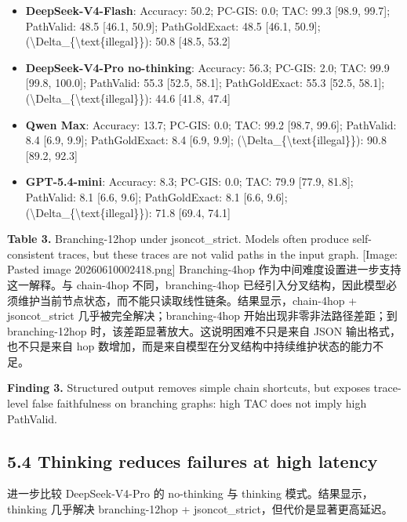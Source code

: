 \documentclass[
  11pt,
]{article}
\providecommand{\tightlist}{%
  \setlength{\itemsep}{0pt}\setlength{\parskip}{0pt}}
\begin{document}
\begin{itemize}
\tightlist
\item
  \textbf{DeepSeek-V4-Flash}: Accuracy: 50.2; PC-GIS: 0.0; TAC: 99.3
  {[}98.9, 99.7{]}; PathValid: 48.5 {[}46.1, 50.9{]}; PathGoldExact:
  48.5 {[}46.1, 50.9{]};
  (\textbackslash Delta\_\{\textbackslash text\{illegal\}\}): 50.8
  {[}48.5, 53.2{]}
\item
  \textbf{DeepSeek-V4-Pro no-thinking}: Accuracy: 56.3; PC-GIS: 2.0;
  TAC: 99.9 {[}99.8, 100.0{]}; PathValid: 55.3 {[}52.5, 58.1{]};
  PathGoldExact: 55.3 {[}52.5, 58.1{]};
  (\textbackslash Delta\_\{\textbackslash text\{illegal\}\}): 44.6
  {[}41.8, 47.4{]}
\item
  \textbf{Qwen Max}: Accuracy: 13.7; PC-GIS: 0.0; TAC: 99.2 {[}98.7,
  99.6{]}; PathValid: 8.4 {[}6.9, 9.9{]}; PathGoldExact: 8.4 {[}6.9,
  9.9{]}; (\textbackslash Delta\_\{\textbackslash text\{illegal\}\}):
  90.8 {[}89.2, 92.3{]}
\item
  \textbf{GPT-5.4-mini}: Accuracy: 8.3; PC-GIS: 0.0; TAC: 79.9 {[}77.9,
  81.8{]}; PathValid: 8.1 {[}6.6, 9.6{]}; PathGoldExact: 8.1 {[}6.6,
  9.6{]}; (\textbackslash Delta\_\{\textbackslash text\{illegal\}\}):
  71.8 {[}69.4, 74.1{]}
\end{itemize}

\textbf{Table 3.} Branching-12hop under jsoncot\_strict. Models often
produce self-consistent traces, but these traces are not valid paths in
the input graph. {[}Image: Pasted image 20260610002418.png{]}
Branching-4hop 作为中间难度设置进一步支持这一解释。与 chain-4hop
不同，branching-4hop
已经引入分叉结构，因此模型必须维护当前节点状态，而不能只读取线性链条。结果显示，chain-4hop
+ jsoncot\_strict 几乎被完全解决；branching-4hop
开始出现非零非法路径差距；到 branching-12hop
时，该差距显著放大。这说明困难不只是来自 JSON 输出格式，也不只是来自 hop
数增加，而是来自模型在分叉结构中持续维护状态的能力不足。

\textbf{Finding 3.} Structured output removes simple chain shortcuts,
but exposes trace-level false faithfulness on branching graphs: high TAC
does not imply high PathValid.

\subsection{5.4 Thinking reduces failures at high
latency}\label{thinking-reduces-failures-at-high-latency}

进一步比较 DeepSeek-V4-Pro 的 no-thinking 与 thinking
模式。结果显示，thinking 几乎解决 branching-12hop +
jsoncot\_strict，但代价是显著更高延迟。
\end{document}
